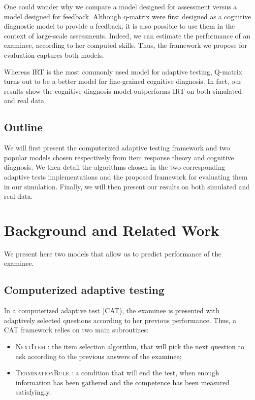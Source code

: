 \documentclass{sig-alternate}
\begin{document}
One could wonder why we compare a model designed for assessment versus a model designed for feedback. Although q-matrix were first designed as a cognitive diagnostic model to provide a feedback, it is also possible to use them in the context of large-scale assessments. Indeed, we can estimate the performance of an examinee, according to her computed skills. Thus, the framework we propose for evaluation captures both models.

Whereas IRT is the most commonly used model for adaptive testing, Q-matrix turns out to be a better model for fine-grained cognitive diagnosis. In fact, our results show the cognitive diagnosis model outperforms IRT on both simulated and real data.

\subsection{Outline}

We will first present the computerized adaptive testing framework and two popular models chosen respectively from item response theory and cognitive diagnosis. We then detail the algorithms chosen in the two corresponding adaptive tests implementations and the proposed framework for evaluating them in our simulation. Finally, we will then present our results on both simulated and real data.

\section{Background and Related Work}

We present here two models that allow us to predict performance of the examinee.

\subsection{Computerized adaptive testing}

In a computerized adaptive test (CAT), the examinee is presented with adaptively selected questions according to her previous performance. Thus, a CAT framework relies on two main subroutines:
\begin{itemize}
\item \textsc{NextItem} : the item selection algorithm, that will pick the next question to ask according to the previous answers of the examinee;
\item \textsc{TerminationRule} : a condition that will end the test, when enough information has been gathered and the competence has been measured satisfyingly.
\end{itemize}
\end{document}
